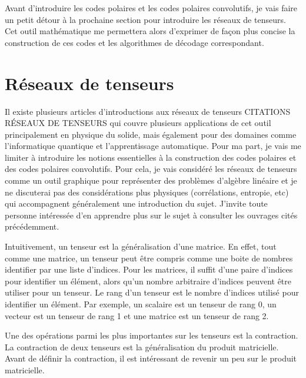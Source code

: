 Avant d'introduire les codes polaires et les codes polaires convolutifs,
je vais faire un petit détour à la prochaine section pour introduire les réseaux de tenseurs.
Cet outil mathématique me permettera alors d'exprimer de façon plus concise la construction
de ces codes et les algorithmes de décodage correspondant.

\section{Réseaux de tenseurs}
\label{sec:reseaux_tenseurs}

Il existe plusieurs articles d'introductions aux réseaux de tenseurs CITATIONS RÉSEAUX DE TENSEURS
qui couvre plusieurs applications de cet outil principalement en physique du solide,
mais également pour des domaines comme l'informatique quantique et l'apprentissage automatique. 
Pour ma part, 
je vais me limiter à introduire les notions essentielles à la construction des 
codes polaires et des codes polaires convolutifs.
Pour cela, 
je vais considéré les réseaux de tenseurs comme un outil graphique pour représenter 
des problèmes d'algèbre linéaire et je ne discuterai pas des considérations plus physiques 
(corrélations, entropie, etc) qui accompagnent généralement une introduction du sujet.
J'invite toute personne intéressée d'en apprendre plus sur le sujet à consulter les ouvrages 
cités précédemment.

Intuitivement, 
un tenseur est la généralisation d'une matrice.
En effet,
tout comme une matrice, 
un tenseur peut être compris comme une boite de nombres identifier par une liste d'indices. 
Pour les matrices,
il suffit d'une paire d'indices pour identifier un élément,
alors qu'un nombre arbitraire d'indices peuvent être utiliser pour un tenseur. 
Le rang d'un tenseur est le nombre d'indices utilisé pour identifier un élément.
Par exemple, 
un scalaire est un tenseur de rang 0, 
un vecteur est un tenseur de rang 1 
et une matrice est un tenseur de rang 2.

Une des opérations parmi les plus importantes sur les tenseurs est la contraction.
La contraction de deux tenseurs est la généralisation du produit matricielle.
Avant de définir la contraction,
il est intéressant de revenir un peu sur le produit matricielle.

